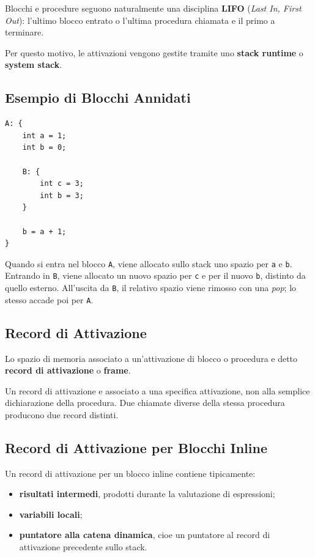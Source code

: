 \documentclass{article}
\begin{document}
Blocchi e procedure seguono naturalmente una disciplina \textbf{LIFO} (\textit{Last In, First Out}): l'ultimo blocco entrato o l'ultima procedura chiamata e il primo a terminare.

Per questo motivo, le attivazioni vengono gestite tramite uno \textbf{stack runtime} o \textbf{system stack}.

\subsection{Esempio di Blocchi Annidati}

\begin{lstlisting}
A: {
    int a = 1;
    int b = 0;

    B: {
        int c = 3;
        int b = 3;
    }

    b = a + 1;
}
\end{lstlisting}

Quando si entra nel blocco \texttt{A}, viene allocato sullo stack uno spazio per \texttt{a} e \texttt{b}. Entrando in \texttt{B}, viene allocato un nuovo spazio per \texttt{c} e per il nuovo \texttt{b}, distinto da quello esterno. All'uscita da \texttt{B}, il relativo spazio viene rimosso con una \textit{pop}; lo stesso accade poi per \texttt{A}.

\subsection{Record di Attivazione}

Lo spazio di memoria associato a un'attivazione di blocco o procedura e detto \textbf{record di attivazione} o \textbf{frame}.

Un record di attivazione e associato a una specifica attivazione, non alla semplice dichiarazione della procedura. Due chiamate diverse della stessa procedura producono due record distinti.

\subsection{Record di Attivazione per Blocchi Inline}

Un record di attivazione per un blocco inline contiene tipicamente:

\begin{itemize}
  \item \textbf{risultati intermedi}, prodotti durante la valutazione di espressioni;
  \item \textbf{variabili locali};
  \item \textbf{puntatore alla catena dinamica}, cioe un puntatore al record di attivazione precedente sullo stack.
\end{itemize}
\end{document}
